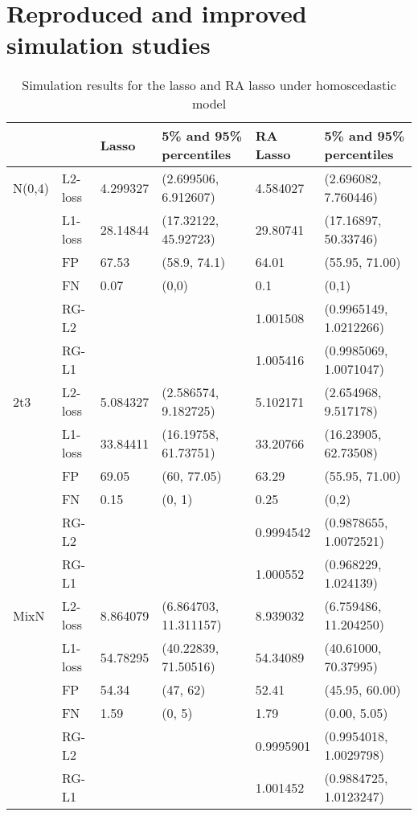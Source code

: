 

\section{Reproduced and improved simulation studies}\label{sec:newsimulation}

\begin{table}[]
\begin{tabular}{llllll}
       &         & Lasso    & 5\% and 95\% percentiles & RA Lasso  & 5\% and 95\% percentiles \\ \hline
N(0,4) & L2-loss & 4.299327 & (2.699506, 6.912607)     & 4.584027  & (2.696082, 7.760446)     \\
       & L1-loss & 28.14844 & (17.32122, 45.92723)     & 29.80741  & (17.16897, 50.33746)     \\
       & FP      & 67.53    & (58.9, 74.1)             & 64.01     & (55.95, 71.00)           \\
       & FN      & 0.07     & (0,0)                    & 0.1       & (0,1)                    \\
       & RG-L2   &          &                          & 1.001508  & (0.9965149, 1.0212266)   \\
       & RG-L1   &          &                          & 1.005416  & (0.9985069, 1.0071047)   \\ \hline
2t3    & L2-loss & 5.084327 & (2.586574, 9.182725)     & 5.102171  & (2.654968, 9.517178)     \\
       & L1-loss & 33.84411 & (16.19758, 61.73751)     & 33.20766  & (16.23905, 62.73508)     \\
       & FP      & 69.05    & (60, 77.05)              & 63.29     & (55.95, 71.00)           \\
       & FN      & 0.15     & (0, 1)                   & 0.25      & (0,2)                    \\
       & RG-L2   &          &                          & 0.9994542 & (0.9878655, 1.0072521)   \\
       & RG-L1   &          &                          & 1.000552  & (0.968229, 1.024139)     \\ \hline
MixN   & L2-loss & 8.864079 & (6.864703, 11.311157)    & 8.939032  & (6.759486, 11.204250)    \\
       & L1-loss & 54.78295 & (40.22839, 71.50516)     & 54.34089  & (40.61000, 70.37995)     \\
       & FP      & 54.34    & (47, 62)                 & 52.41     & (45.95, 60.00)           \\
       & FN      & 1.59     & (0, 5)                   & 1.79      & (0.00, 5.05)             \\
       & RG-L2   &          &                          & 0.9995901 & (0.9954018, 1.0029798)   \\
       & RG-L1   &          &                          & 1.001452  & (0.9884725, 1.0123247)  
\end{tabular}
\caption{Simulation results for the lasso and RA lasso under homoscedastic model}
\end{table}